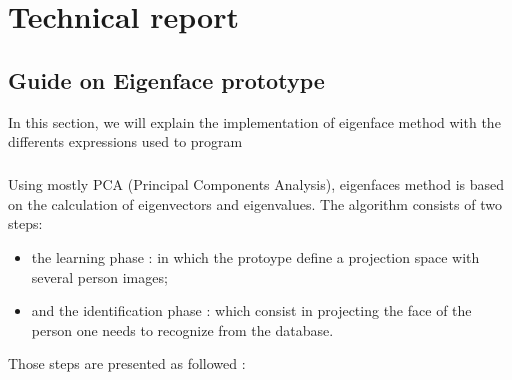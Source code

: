 \chapter{Technical report}



\section{Guide on Eigenface prototype}
In this section, we will explain the implementation of  eigenface  method  with the differents expressions used to program
\paragraph{}
Using mostly PCA (Principal Components Analysis), eigenfaces method is based on the calculation of eigenvectors and eigenvalues.
The algorithm consists of two steps:
 \begin{itemize}
 \item the learning phase : in which the protoype define a projection space with several person images; 
 \item and the identification phase  : which consist in projecting the face of the person one needs to recognize from the database.
\end{itemize} 
 Those steps are presented as followed :
